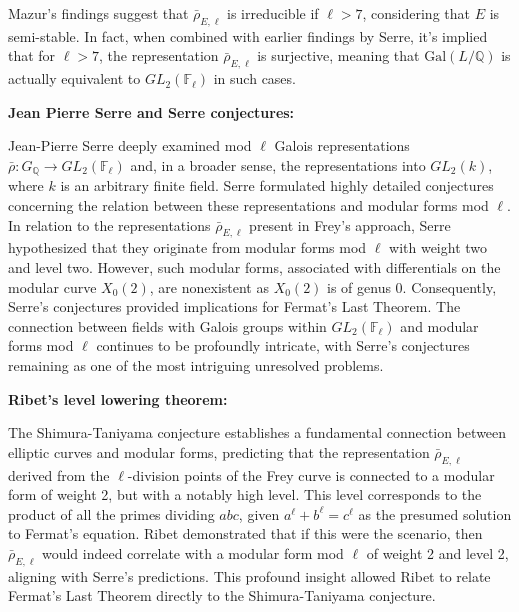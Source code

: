Mazur’s findings suggest that \(\bar{\rho}_{E, \ell}\) is irreducible if \(\ell>7\), considering that \(E\) is semi-stable. In fact, when combined with earlier findings by Serre, it’s implied that for \(\ell>7\), the representation \(\bar{\rho}_{E, \ell}\) is surjective, meaning that \(\mathrm{Gal}(L / \mathbb{Q})\) is actually equivalent to \(GL_{2}(\mathbb{F}_{\ell})\) in such cases.\\

\begin{center}
    \textbf{Jean Pierre Serre and Serre conjectures:}
\end{center}
Jean-Pierre Serre deeply examined mod \( \ell \) Galois representations \( \bar{\rho}: G_{\mathbb{Q}} \longrightarrow GL_{2}(\mathbb{F}_{\ell}) \) and, in a broader sense, the representations into \( GL_{2}(k) \), where \( k \) is an arbitrary finite field. Serre formulated highly detailed conjectures concerning the relation between these representations and modular forms mod \( \ell \). \\In relation to the representations \( \bar{\rho}_{E, \ell} \) present in Frey’s approach, Serre hypothesized that they originate from modular forms mod \( \ell \) with weight two and level two. However, such modular forms, associated with differentials on the modular curve \( X_{0}(2) \), are nonexistent as \( X_{0}(2) \) is of genus 0. Consequently, Serre’s conjectures provided implications for Fermat’s Last Theorem. The connection between fields with Galois groups within \( GL_{2}(\mathbb{F}_{\ell}) \) and modular forms mod \( \ell \) continues to be profoundly intricate, with Serre’s conjectures remaining as one of the most intriguing unresolved problems.\\

\begin{center}
    \textbf{Ribet's level lowering theorem:}
\end{center}
The Shimura-Taniyama conjecture establishes a fundamental connection between elliptic curves and modular forms, predicting that the representation \( \bar{\rho}_{E, \ell} \) derived from the \( \ell \)-division points of the Frey curve is connected to a modular form of weight 2, but with a notably high level. This level corresponds to the product of all the primes dividing \( a b c \), given \( a^{\ell} + b^{\ell} = c^{\ell} \) as the presumed solution to Fermat’s equation. Ribet demonstrated that if this were the scenario, then \( \bar{\rho}_{E, \ell} \) would indeed correlate with a modular form mod \( \ell \) of weight 2 and level 2, aligning with Serre’s predictions. This profound insight allowed Ribet to relate Fermat’s Last Theorem directly to the Shimura-Taniyama conjecture.


